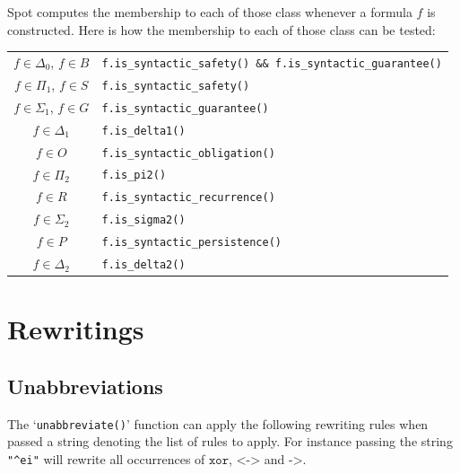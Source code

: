 \documentclass[a4paper,twoside,10pt,DIV=12]{scrreprt}
\newcommand{\XOR}{\mathbin{\texttt{xor}}}
\newcommand{\IMPLIES}{\mathbin{\texttt{->}}}
\newcommand{\EQUIV}{\mathbin{\texttt{<->}}}
\newcommand{\0}{\texttt{0}}
\newcommand{\1}{\texttt{1}}
\begin{document}
Spot computes the membership to each of those class whenever a formula
$f$ is constructed.  Here is how the membership to each of those class
can be tested:
\begin{center}
\begin{tabular}{cl}
  \toprule
  $f\in \Delta_0$, $f\in B$ & \texttt{f.is\_syntactic\_safety() \&\& f.is\_syntactic\_guarantee()} \\
  $f\in \Pi_1$, $f\in S$ & \texttt{f.is\_syntactic\_safety()} \\
  $f\in \Sigma_1$, $f\in G$ & \texttt{f.is\_syntactic\_guarantee()} \\
  $f\in \Delta_1$ & \texttt{f.is\_delta1()} \\
  $f\in O$ & \texttt{f.is\_syntactic\_obligation()} \\
  $f\in \Pi_2$ & \texttt{f.is\_pi2()} \\
  $f\in R$ & \texttt{f.is\_syntactic\_recurrence()} \\
  $f\in \Sigma_2$ & \texttt{f.is\_sigma2()} \\
  $f\in P$ & \texttt{f.is\_syntactic\_persistence()} \\
  $f\in \Delta_2$ & \texttt{f.is\_delta2()} \\
  \bottomrule
\end{tabular}
\end{center}


\chapter{Rewritings}

\section{Unabbreviations}\label{sec:unabbrev}

The `\verb=unabbreviate()=' function can apply the following rewriting
rules when passed a string denoting the list of rules to apply.  For
instance passing the string \texttt{"\^{}ei"} will rewrite all
occurrences of $\XOR$, $\EQUIV$ and $\IMPLIES$.
\end{document}
